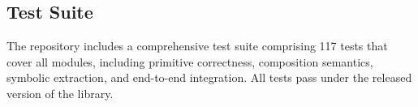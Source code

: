 \subsection{Test Suite}

The repository includes a comprehensive test suite comprising 117
tests that cover all modules, including primitive correctness,
composition semantics, symbolic extraction, and end-to-end integration.
All tests pass under the released version of the library.
